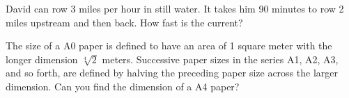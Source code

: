 \begin{exercise}

David can row 3 miles per hour in still water. It takes him 90 minutes
to row 2 miles upstream and then back. How fast is the current?

\end{exercise}
\vspace*{5\baselineskip}

\begin{exercise}
The size of a A0 paper is defined to have an area of 1 square meter with
the longer dimension \(\sqrt[4]{2}\) meters. Successive paper sizes in
the series A1, A2, A3, and so forth, are defined by halving the
preceding paper size across the larger dimension. Can you find the
dimension of a A4 paper?
\end{exercise}


